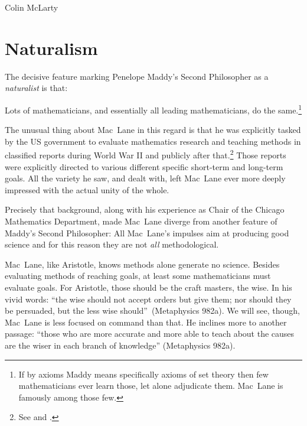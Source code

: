 \begin{artengenv}{Colin McLarty}
\section{Naturalism}\label{S:naturalism}

The decisive feature marking Penelope Maddy's Second Philosopher as a \textit{naturalist} is that:

Lots of mathematicians, and essentially all leading mathematicians, do the same.\footnote{If by axioms Maddy means specifically axioms of set theory then few mathematicians ever learn those, let alone adjudicate them. Mac~Lane is famously among those few.}

The unusual thing about Mac~Lane in this regard is that he was explicitly tasked by the US government to evaluate mathematics research and teaching methods in classified reports during World War II and publicly after that.\footnote{See \textcite{MacLFederal,MacLColumb,MacLChina} and \textcite{SteingartPhD}.}  Those reports were explicitly directed to various different specific short-term and long-term goals.  All the variety he saw, and dealt with, left Mac~Lane ever more deeply impressed with the actual unity of the whole.


Precisely that background, along with his experience as Chair of the Chicago Mathematics Department, made Mac~Lane diverge from another feature of Maddy's Second Philosopher:
All Mac~Lane's impulses aim at producing good science and for this reason they  are not \textit{all} methodological.

Mac~Lane, like Aristotle, knows methods alone generate no science.  Besides evaluating methods of reaching goals, at least some mathematicians must evaluate goals. For Aristotle, those should be the craft masters, the wise.  In his vivid words: ``the wise should not accept orders but give them;  nor should they be persuaded, but the less wise should''~(Metaphysics 982a).  We will see, though, Mac~Lane is less focused on command than that.  He inclines more to another passage: ``those who are more accurate and more able to teach about the causes are the wiser in each branch of knowledge'' (Metaphysics 982a).



\end{artengenv}
